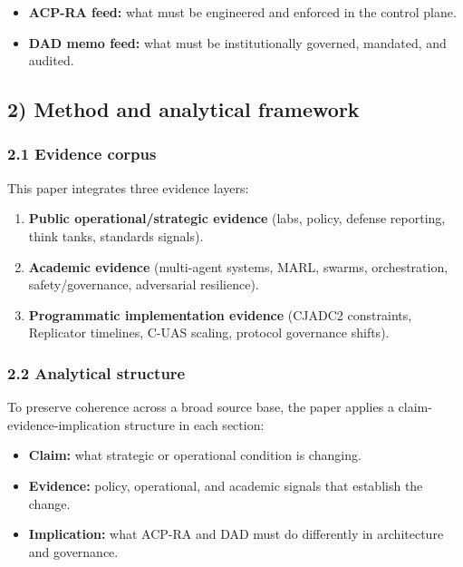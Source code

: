 \documentclass[11pt]{article}
\begin{document}
\begin{itemize}
\tightlist
\item
  \textbf{ACP-RA feed:} what must be engineered and enforced in the
  control plane.
\item
  \textbf{DAD memo feed:} what must be institutionally governed,
  mandated, and audited.
\end{itemize}

\hypertarget{method-and-analytical-framework}{%
\subsection{2) Method and analytical
framework}\label{method-and-analytical-framework}}

\hypertarget{evidence-corpus}{%
\subsubsection{2.1 Evidence corpus}\label{evidence-corpus}}

This paper integrates three evidence layers:

\begin{enumerate}
\def\labelenumi{\arabic{enumi}.}
\tightlist
\item
  \textbf{Public operational/strategic evidence} (labs, policy, defense
  reporting, think tanks, standards signals).
\item
  \textbf{Academic evidence} (multi-agent systems, MARL, swarms,
  orchestration, safety/governance, adversarial resilience).
\item
  \textbf{Programmatic implementation evidence} (CJADC2 constraints,
  Replicator timelines, C-UAS scaling, protocol governance shifts).
\end{enumerate}

\hypertarget{analytical-structure}{%
\subsubsection{2.2 Analytical structure}\label{analytical-structure}}

To preserve coherence across a broad source base, the paper applies a
claim-evidence-implication structure in each section:

\begin{itemize}
\tightlist
\item
  \textbf{Claim:} what strategic or operational condition is changing.
\item
  \textbf{Evidence:} policy, operational, and academic signals that
  establish the change.
\item
  \textbf{Implication:} what ACP-RA and DAD must do differently in
  architecture and governance.
\end{itemize}
\end{document}
